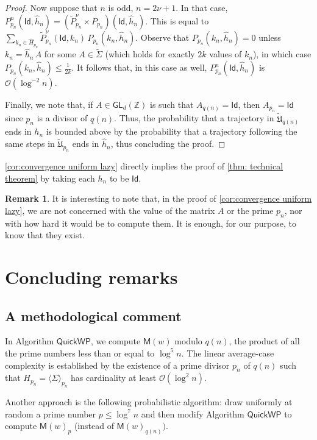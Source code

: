 \documentclass{article}
\def\alph{\tilde{\Sigma}}
\def\Id{\textsf{Id}}
\def\O{\mathcal{O}}
\def\tU{\tilde{\mathfrak{U}}}
\def\tP{\tilde{P}}
\def\Z{\mathbb{Z}}
\def\GL{\textsf{GL}}
\def\S{\textsf{QuickWP}}
\def\mat{\textsf{M}}
\theoremstyle{plain}
\theoremstyle{definition}
\newtheorem{remark}[theorem]{Remark}
\begin{document}
\begin{proof}
Now suppose that $n$ is odd, $n=2\nu+1$.  In that case, $P_{p_n}^n(\Id,\hat h_n) = \left(\tP_{p_n}^\nu\times P_{p_n}\right)(\Id,\hat h_n)$. This is equal to $\sum_{k_n \in \hat H_{p_n}}\tP_{p_n}^\nu(\Id, k_n)\, P_{p_n}(k_n,\hat h_n)$. Observe that $P_{p_n}(k_n,\hat h_n) = 0$ unless $k_n = \hat h_n\, A$ for some $A\in \alph$ (which holds for exactly $2k$ values of $k_n$), in which case $P_{p_n}(k_n,\hat h_n) \le \frac 1{2k}$. It follows that, in this case as well, $P_{p_n}^n(\Id,\hat h_n)$ is $\O(\log^{-2}n)$.

Finally, we note that, if $A\in\GL_d(\Z)$ is such that $A_{q(n)}=\Id$, then $A_{p_n}=\Id$ since $p_n$ is a divisor of $q(n)$.
Thus, the probability that a trajectory in $\tU_{q(n)}$ ends in $h_n$ is bounded above by the probability that a trajectory following the same steps in $\tU_{p_n}$ ends in $\hat h_n$, thus concluding the proof.
%
\end{proof}

\cref{cor:convergence uniform lazy} directly implies the proof of 
\cref{thm: technical theorem} by taking each $h_n$ to be $\Id$.
 
\begin{remark}
    It is interesting to note that, in the proof of \cref{cor:convergence uniform lazy}, we are not concerned with the value of the matrix $A$ or the prime $p_n$, nor with how hard it would be to compute them. It is enough, for our purpose, to know that they exist.
\end{remark}

\section{Concluding remarks}\label{sec: concluding}

\subsection{A methodological comment}

In Algorithm $\S$, we compute $\mat(w)$ modulo $q(n)$, the product of all the prime numbers less than or equal to $\log^5n$. The linear average-case complexity is established by the existence of a prime divisor $p_n$ of $q(n)$ such that $H_{p_n} = \langle \Sigma\rangle_{p_n}$ has cardinality at least $\O(\log^2n)$.

Another approach is the following probabilistic algorithm: draw uniformly at random a prime number $p \le \log^7n$ and then modify Algorithm $\S$ to compute $\mat(w)_p$ (instead of $\mat(w)_{q(n)})$.
\end{document}
